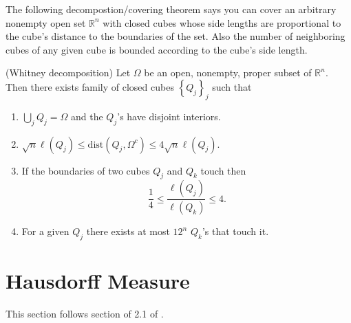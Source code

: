 The following decompostion/covering theorem says you can cover an
arbitrary nonempty open set $\mathbb{R}^n$ with closed cubes whose side
lengths are proportional to the cube's distance to the boundaries
of the set. Also the number of neighboring cubes of any given cube is bounded according
to the cube's side length.

\begin{thm}(Whitney
  decomposition)\cite[appendix J]{grafakos2008classical}
  Let $\Omega$ be an open, nonempty, proper subset of
  $\mathbb{R}^n$. Then there exists family of closed cubes $\left\{
  Q_j \right\}_{j}$ such that
  \begin{enumerate}
    \item $\bigcup_j Q_j = \Omega$ and the $Q_j$'s have disjoint
      interiors.
    \item $\sqrt{n}\ell(Q_j)\le
      \text{dist}(Q_j,\Omega^c) \le 4\sqrt{n}\ell(Q_j)$.
    \item If the boundaries of two cubes $Q_j$ and $Q_k$ touch then
      \begin{equation*}
        \frac{1}{4} \le \frac{\ell(Q_j)}{\ell(Q_k)} \le 4.
      \end{equation*}
    \item For a given $Q_j$ there exists at most $12^n$ $Q_k$'s
      that touch it.
  \end{enumerate}

\end{thm}


\section{Hausdorff Measure}
\label{sec:hausdorff_measure}

This section follows section of 2.1 of
\cite{evans1991measures}.

